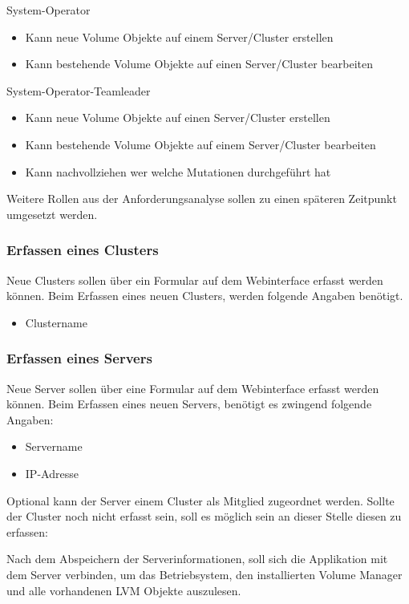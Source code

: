 System-Operator
\begin{itemize}
\item Kann neue Volume Objekte auf einem Server/Cluster erstellen
\item Kann bestehende Volume Objekte auf einen Server/Cluster bearbeiten
\end{itemize}

System-Operator-Teamleader
\begin{itemize}
\item Kann neue Volume Objekte auf einen Server/Cluster erstellen
\item Kann bestehende Volume Objekte auf einem Server/Cluster bearbeiten
\item Kann nachvollziehen wer welche Mutationen durchgeführt hat
\end{itemize}

Weitere Rollen aus der Anforderungsanalyse sollen zu einen späteren Zeitpunkt umgesetzt werden.

\subsubsection{Erfassen eines Clusters}
Neue Clusters sollen über ein Formular auf dem Webinterface erfasst werden können.
Beim Erfassen eines neuen Clusters, werden folgende Angaben benötigt.

\begin{itemize}
\item Clustername
\end{itemize}

\subsubsection{Erfassen eines Servers}
Neue Server sollen über eine Formular auf dem Webinterface erfasst werden können.
Beim Erfassen eines neuen Servers, benötigt es zwingend folgende Angaben:

\begin{itemize}
\item Servername
\item IP-Adresse\newline
\end{itemize}

Optional kann der Server einem Cluster als Mitglied zugeordnet werden. Sollte der Cluster noch nicht erfasst sein, soll es möglich sein an dieser Stelle diesen zu erfassen:

Nach dem Abspeichern der Serverinformationen, soll sich die Applikation mit dem Server verbinden, um das Betriebsystem, den installierten Volume Manager und alle vorhandenen LVM Objekte auszulesen.


